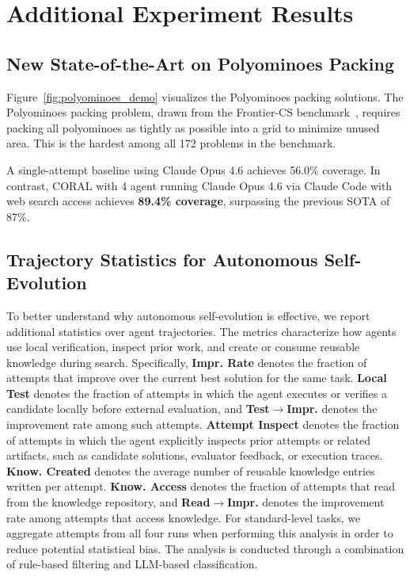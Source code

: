 \section{Additional Experiment Results}
\label{app:experiment_results}

\subsection{New State-of-the-Art on Polyominoes Packing}
\label{app:polyominoes_sota}

Figure~\ref{fig:polyominoes_demo} visualizes the Polyominoes packing solutions. The Polyominoes packing problem, drawn from the Frontier-CS benchmark~\citep{mang2025frontiercs}, requires packing all polyominoes as tightly as possible into a grid to minimize unused area. This is the hardest among all 172 problems in the benchmark.

A single-attempt baseline using Claude Opus 4.6 achieves 56.0\% coverage. In contrast, CORAL with 4 agent running Claude Opus 4.6 via Claude Code with web search access achieves \textbf{89.4\% coverage}, surpassing the previous SOTA of 87\%. 



\subsection{Trajectory Statistics for Autonomous Self-Evolution}
\label{app:trajectory_statistics}

To better understand why autonomous self-evolution is effective, we report additional statistics over agent trajectories. The metrics characterize how agents use local verification, inspect prior work, and create or consume reusable knowledge during search. Specifically, \textbf{Impr. Rate} denotes the fraction of attempts that improve over the current best solution for the same task. \textbf{Local Test} denotes the fraction of attempts in which the agent executes or verifies a candidate locally before external evaluation, and \textbf{Test$\rightarrow$Impr.} denotes the improvement rate among such attempts. \textbf{Attempt Inspect} denotes the fraction of attempts in which the agent explicitly inspects prior attempts or related artifacts, such as candidate solutions, evaluator feedback, or execution traces. \textbf{Know. Created} denotes the average number of reusable knowledge entries written per attempt. \textbf{Know. Access} denotes the fraction of attempts that read from the knowledge repository, and \textbf{Read$\rightarrow$Impr.} denotes the improvement rate among attempts that access knowledge. For standard-level tasks, we aggregate attempts from all four runs when performing this analysis in order to reduce potential statistical bias. The analysis is conducted through a combination of rule-based filtering and LLM-based classification.


